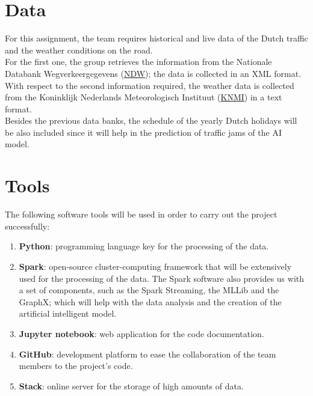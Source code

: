 \section{Data}

For this assignment, the team requires historical and live data of the Dutch traffic and the weather conditions on the road.\\

For the first one, the group retrieves the information from the Nationale Databank Wegverkeergegevens (\underline{NDW}); the data is collected in an XML format.\\

With respect to the second information required, the weather data is collected from the Koninklijk Nederlands Meteorologisch Instituut (\underline{KNMI}) in a text format.\\

Besides the previous data banks, the schedule of the yearly Dutch holidays will be also included since it will help in the prediction of traffic jams of the AI model.\\

\section{Tools}

The following software tools will be used in order to carry out the project successfully:

\begin{enumerate}
	\item \textbf{Python}: programming language key for the processing of the data.
	\item \textbf{Spark}: open-source cluster-computing framework that will be extensively used for the processing of the data. The Spark software also provides us with a set of components, such as the Spark Streaming, the MLLib and the GraphX; which will help with the data analysis and the creation of the artificial intelligent model.	
	\item \textbf{Jupyter notebook}: web application for the code documentation.
	\item \textbf{GitHub}: development platform to ease the collaboration of the team members to the project's code.
	\item \textbf{Stack}: online server for the storage of high amounts of data.
\end{enumerate}

